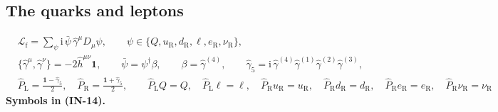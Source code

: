 \documentclass[
  10pt,
]{article}
\begin{document}
\hypertarget{the-quarks-and-leptons}{%
\subsection{The quarks and leptons}\label{the-quarks-and-leptons}}

\[
\begin{aligned}
&\mathcal{L}_{\mathrm{f}} = \sum_{\psi}\mathrm{i}\,\bar\psi\,\hat\gamma^\mu D_\mu\psi,\qquad
 \psi \in \{Q, u_{\mathrm{R}}, d_{\mathrm{R}}, \ell, e_{\mathrm{R}}, \nu_{\mathrm{R}}\},\\
&\{\hat\gamma^\mu, \hat\gamma^\nu\} = -2\hat h^{\mu\nu}\mathbf{1},\qquad \bar\psi = \psi^\dagger\beta,\qquad
 \beta = \hat\gamma^{(4)},\qquad \hat\gamma_5 = \mathrm{i}\,\hat\gamma^{(4)}\hat\gamma^{(1)}\hat\gamma^{(2)}\hat\gamma^{(3)},\\
&\hat P_{\mathrm{L}} = \frac{\mathbf{1} - \hat\gamma_5}{2},\quad \hat P_{\mathrm{R}} = \frac{\mathbf{1} + \hat\gamma_5}{2},\qquad
 \hat P_{\mathrm{L}}Q = Q,\quad \hat P_{\mathrm{L}}\ell = \ell,\quad \hat P_{\mathrm{R}}u_{\mathrm{R}} = u_{\mathrm{R}},\quad
 \hat P_{\mathrm{R}}d_{\mathrm{R}} = d_{\mathrm{R}},\quad \hat P_{\mathrm{R}}e_{\mathrm{R}} = e_{\mathrm{R}},\quad
 \hat P_{\mathrm{R}}\nu_{\mathrm{R}} = \nu_{\mathrm{R}}
\end{aligned} \tag{IN-14}
\] \textbf{Symbols in (IN-14).}
\end{document}

